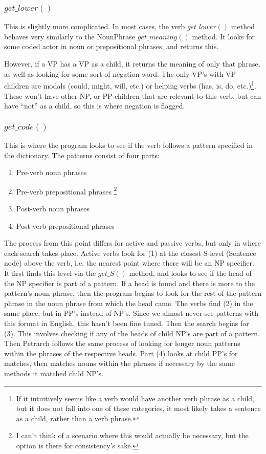 \documentclass[11pt]{article}
\begin{document}
\subsubsection{$get\_lower()$}
This is slightly more complicated. In most cases, the verb $get\_lower()$ method 
behaves very similarly to the NounPhrase $get\_meaning()$ method. It looks for 
some coded actor in noun or prepositional phrases, and returns this. 

However, if 
a VP has a VP as a child, it returns the meaning of only that phrase, as well as looking 
for some sort of negation word. The only 
VP's with VP children are modals (could, might, will, etc.) or helping verbs (has, is, 
do, etc.)\footnote{If it intuitively seems like a verb would have another verb phrase as a child, but it does not fall into one of these categories,
it most likely takes a sentence as a child, rather than a verb phrase. }. These won't have other NP, or PP children that are relevant to 
this verb, but can have ``not'' as a child, so this is where negation is 
flagged.
\subsubsection{$get\_code()$}
This is where the program looks to see if the verb follows a pattern 
specified in the dictionary. The patterns consist of four parts: \begin{enumerate}
\item Pre-verb noun phrases \item Pre-verb prepositional phrases \footnote{I can't think of a scenario where 
this would actually be necessary, but the option is there for consistency's sake.} \item 
Post-verb noun phrases \item Post-verb prepositional phrases \end{enumerate}

The process from this point differs for active and passive verbs, but only in 
where each search takes place. Active verbs look for (1) at the closest S-level (Sentence node) above the verb, i.e. the 
nearest point where there will be an NP specifier. It first finds this level via 
the $get\_S()$ method, and looks to see if the head of the NP specifier is part 
of a pattern. If a head is found and there is more to the pattern's noun phrase,
 then the program begins to look for the
rest of the pattern phrase in the noun phrase from which the head came. 
 The verbs find (2) in the same place, but in PP's instead of NP's. Since we 
almost never see patterns with this format in English, this hasn't been fine 
tuned. Then the search begins for (3). This involves checking if any of the 
heads of child NP's are part of a pattern. Then Petrarch follows the same process of looking for 
longer noun patterns within the phrases of the respective heads.
Part (4) looks at child PP's for matches, then matches nouns within the phrases 
if necessary by the same methods it matched child NP's.
\end{document}
